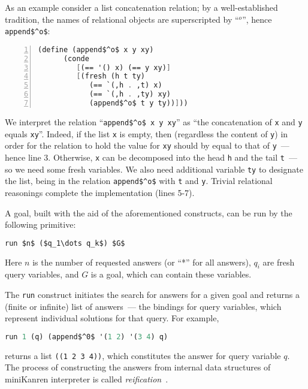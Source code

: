 As an example consider a list concatenation relation; by a well-established tradition, the names 
of relational objects are superscripted by ``$^o$'', hence \lstinline{append$^o$}: 

\begin{lstlisting}[mathescape=true,language=scheme,numbers=left,numberstyle=\small,stepnumber=1,numbersep=-5pt]
   (define (append$^o$ x y xy) 
      (conde 
         [(== '() x) (== y xy)]
         [(fresh (h t ty)
            (== `(,h . ,t) x)
            (== `(,h . ,ty) xy)
            (append$^o$ t y ty))]))
\end{lstlisting}

We interpret the relation ``\lstinline{append$^o$ x y xy}'' as ``the concatenation of \lstinline{x} and \lstinline{y} 
equals \lstinline{xy}''. Indeed, if the list \lstinline{x} is empty, then (regardless the content of \lstinline{y}) in order for the relation to hold 
the value for \lstinline{xy} should by equal to that of \lstinline{y}~--- hence line 3. Otherwise, \lstinline{x} can be decomposed into the head 
\lstinline{h} and the tail \lstinline{t}~--- so we need some fresh variables. We also need additional variable \lstinline{ty} to designate the list, 
being in the relation \lstinline{append$^o$} with \lstinline{t} and \lstinline{y}. Trivial relational reasonings complete the implementation (lines 5-7).

A goal, built with the aid of the aforementioned constructs, can be run by the following primitive:

\begin{lstlisting}[mathescape=true,language=scheme]
   run $n$ ($q_1\dots q_k$) $G$
\end{lstlisting}

Here $n$ is the number of requested answers (or ``*'' for all answers), $q_i$ are fresh query variables, and $G$ is a goal, which can
contain these variables. 

The \lstinline{run} construct initiates the search for answers for a given goal and returns a (finite or infinite) list 
of answers~--- the bindings for query variables, which represent individual solutions for that query. For example,

\begin{lstlisting}[mathescape=true,language=scheme]
   run 1 (q) (append$^0$ '(1 2) '(3 4) q) 
\end{lstlisting}

\noindent returns a list \lstinline{((1 2 3 4))}, which constitutes the answer for query variable $q$. The process of constructing
the answers from internal data structures of miniKanren interpreter is called \emph{reification}~\cite{WillThesis}. 

